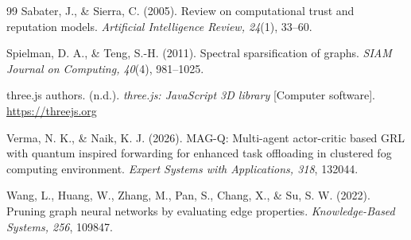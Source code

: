 \begin{singlespace}
\begin{thebibliography}{99}
 Sabater, J., \& Sierra, C. (2005). Review on
computational trust and reputation models. \emph{Artificial Intelligence
Review, 24}(1), 33--60.

 Spielman, D. A., \& Teng, S.-H. (2011). Spectral
sparsification of graphs. \emph{SIAM Journal on Computing, 40}(4),
981--1025.

 three.js authors. (n.d.). \emph{three.js: JavaScript 3D
library} [Computer software]. \url{https://threejs.org}

 Verma, N. K., \& Naik, K. J. (2026). MAG-Q: Multi-agent
actor-critic based GRL with quantum inspired forwarding for enhanced task
offloading in clustered fog computing environment. \emph{Expert Systems with
Applications, 318}, 132044.

 Wang, L., Huang, W., Zhang, M., Pan, S., Chang, X., \& Su,
S. W. (2022). Pruning graph neural networks by evaluating edge properties.
\emph{Knowledge-Based Systems, 256}, 109847.

\end{thebibliography}
\end{singlespace}
